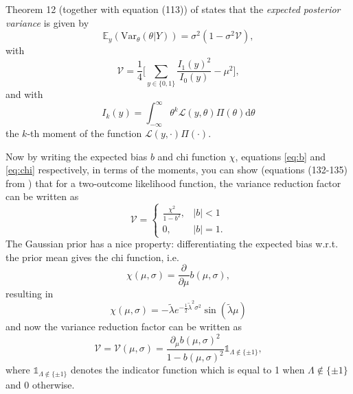 \documentclass[]{report}
\begin{document}
Theorem 12 (together with equation (113)) of \cite{Koh2020} states that the \textit{expected posterior variance} is given by
\begin{equation}
    \mathbb{E}_y(\text{Var}_{\theta}(\theta | Y)) = \sigma^2(1-\sigma^2\mathcal{V}),
\end{equation}
with
\begin{equation}
    \mathcal{V} = \frac{1}{4}\Bigg[ \sum_{y\in \{0,1\}}\frac{I_1(y)^2}{I_0(y)} - \mu^2\Bigg],
\end{equation}
and with
\begin{equation}
    I_k(y) = \int_{-\infty}^{\infty} \theta^k \mathcal{L}(y, \theta)\Pi(\theta) \text{d}\theta
\end{equation}
the $k$-th moment of the function $\mathcal{L}(y, \cdot)\Pi(\cdot)$.

Now by writing the expected bias $b$ and chi function $\chi$, equations \eqref{eq:b} and \eqref{eq:chi} respectively, in terms of the moments, you can show (equations (132-135) from \cite{Koh2020}) that for a two-outcome likelihood function, the variance reduction factor can be written as
\begin{equation}
    \mathcal{V} = \begin{cases}
        \frac{\chi^2}{1-b^2},   & |b|<1\\
        0,                      & |b|=1.
    \end{cases}
\end{equation}
The Gaussian prior has a nice property: differentiating the expected bias w.r.t. the prior mean gives the chi function, i.e.
\begin{equation}
\label{eq:chi-diff}
    \chi(\mu, \sigma) = \frac{\partial}{\partial\mu}b(\mu, \sigma),
\end{equation}
resulting in
\begin{equation}
\label{eq:chi-gaussian}
    \chi(\mu, \sigma) = - \tilde{\lambda} e^{-\frac{1}{2}\tilde{\lambda}^2\sigma^2}\sin(\tilde{\lambda}\mu)
\end{equation}
and now the variance reduction factor can be written as
\begin{equation}
    \mathcal{V} = \mathcal{V}(\mu, \sigma) = \frac{\partial_{\mu}b(\mu, \sigma)^2}{1 - b(\mu, \sigma)^2} \mathbb{1}_{\Lambda \notin \{\pm1\}},
\end{equation}
where $\mathbb{1}_{\Lambda \notin \{\pm1\}}$ denotes the indicator function which is equal to 1 when $\Lambda \notin \{\pm1\}$ and $0$ otherwise.
\end{document}
